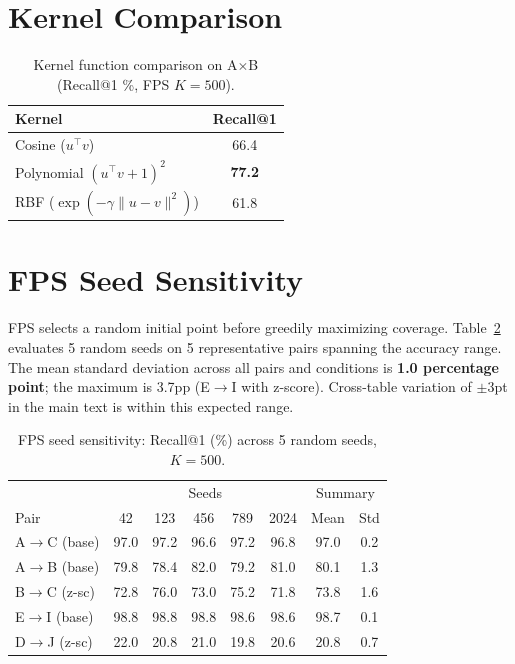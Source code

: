 \documentclass{article}
\begin{document}

\appendix

\section{Kernel Comparison}
\label{app:kernels}

\begin{table}[h]
\centering
\caption{Kernel function comparison on A$\times$B (Recall@1 \%, FPS $K{=}500$).}
\label{tab:kernels}
\begin{tabular}{@{}lc@{}}
\toprule
Kernel & Recall@1 \\
\midrule
Cosine ($u^\top v$) & 66.4 \\
Polynomial $(u^\top v + 1)^2$ & \textbf{77.2} \\
RBF ($\exp(-\gamma \|u-v\|^2)$) & 61.8 \\
\bottomrule
\end{tabular}
\end{table}

\section{FPS Seed Sensitivity}
\label{app:seed}

FPS selects a random initial point before greedily maximizing coverage. Table~\ref{tab:seed} evaluates 5 random seeds on 5 representative pairs spanning the accuracy range. The mean standard deviation across all pairs and conditions is \textbf{1.0 percentage point}; the maximum is 3.7pp (E$\to$I with z-score). Cross-table variation of $\pm$3pt in the main text is within this expected range.

\begin{table}[h]
\centering
\caption{FPS seed sensitivity: Recall@1 (\%) across 5 random seeds, $K{=}500$.}
\label{tab:seed}
\small
\begin{tabular}{@{}lccccc|cc@{}}
\toprule
 & \multicolumn{5}{c|}{Seeds} & \multicolumn{2}{c}{Summary} \\
Pair & 42 & 123 & 456 & 789 & 2024 & Mean & Std \\
\midrule
A$\to$C (base)  & 97.0 & 97.2 & 96.6 & 97.2 & 96.8 & 97.0 & 0.2 \\
A$\to$B (base)  & 79.8 & 78.4 & 82.0 & 79.2 & 81.0 & 80.1 & 1.3 \\
B$\to$C (z-sc)  & 72.8 & 76.0 & 73.0 & 75.2 & 71.8 & 73.8 & 1.6 \\
E$\to$I (base)  & 98.8 & 98.8 & 98.8 & 98.6 & 98.6 & 98.7 & 0.1 \\
D$\to$J (z-sc)  & 22.0 & 20.8 & 21.0 & 19.8 & 20.6 & 20.8 & 0.7 \\
\bottomrule
\end{tabular}
\end{table}
\end{document}

